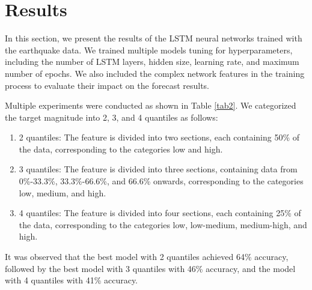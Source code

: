 \documentclass[sn-mathphys-num]{sn-jnl}
\begin{document}
\section{Results}\label{results}

In this section, we present the results of the LSTM neural networks trained with the earthquake data. We trained multiple models tuning for hyperparameters, including the number of LSTM layers, hidden size, learning rate, and maximum number of epochs. We also included the complex network features in the training process to evaluate their impact on the forecast results.

Multiple experiments were conducted as shown in Table \ref{tab2}. We categorized the target magnitude into 2, 3, and 4 quantiles as follows:
\begin{enumerate}
    \item 2 quantiles: The feature is divided into two sections, each containing 50\% of the data, corresponding to the categories low and high.
    \item 3 quantiles: The feature is divided into three sections, containing data from 0\%-33.3\%, 33.3\%-66.6\%, and 66.6\% onwards, corresponding to the categories low, medium, and high.
    \item 4 quantiles: The feature is divided into four sections, each containing 25\% of the data, corresponding to the categories low, low-medium, medium-high, and high.
\end{enumerate}

It was observed that the best model with 2 quantiles achieved 64\% accuracy, followed by the best model with 3 quantiles with 46\% accuracy, and the model with 4 quantiles with 41\% accuracy.
\end{document}
